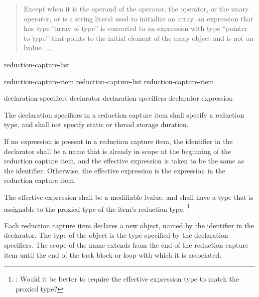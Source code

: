 \begin{quote}
Except when it
is the operand of the  operator,
the  operator,
or the unary \tcode{\&} operator,
or is a string literal used to initialize an array,
an expression that has type ``array of type''
is converted to an expression with type ``pointer to type''
that points to the initial element of the array object
and is not an lvalue. ...
\end{quote}



\begin{bnf}
\br
{} \terminal{(} reduction-capture-list \terminal{)}
\end{bnf}

\begin{bnf}
\br
reduction-capture-item
\br
reduction-capture-list \terminal{,} reduction-capture-item
\end{bnf}

\begin{bnf}
\br
declaration-specifiers declarator
\br
declaration-specifiers declarator \terminal{:} expression
\end{bnf}


\pnum
The declaration specifiers in a reduction capture item
shall specify a reduction type,
and shall not specify static or thread storage duration.

\pnum
If no expression is present in a reduction capture item,
the identifier in the declarator
shall be a name that is already in scope
at the beginning of the reduction capture item,
and the effective expression is taken to be the same as the identifier.
Otherwise, the effective expression
is the expression in the reduction capture item.

\pnum
The effective expression shall be a modifiable lvalue,
and shall have a type that is assignable to the proxied type
of the item's reduction type.
\footnote{:
Would it be better to require the effective expression type
to match the proxied type?
}


\pnum
Each reduction capture item declares a new object,
named by the identifier in the declarator.
The type of the object is the type specified by the declaration specifiers.
The scope of the name extends from the end of the reduction capture item
until the end of the task block or loop with which it is associated.

